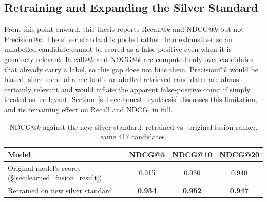 \documentclass[a4paper,oneside,bibliography=totoc]{scrbook}
\begin{document}
\subsection{Retraining and Expanding the Silver Standard}
\label{subsec:refit_fusion_ranker_result}

From this point onward, this thesis reports Recall@$k$ and NDCG@$k$ but not Precision@$k$. The silver standard is pooled rather than exhaustive, so an unlabelled candidate cannot be scored as a false positive even when it is genuinely relevant. Recall@$k$ and NDCG@$k$ are computed only over candidates that already carry a label, so this gap does not bias them. Precision@$k$ would be biased, since some of a method's unlabelled retrieved candidates are almost certainly relevant and would inflate the apparent false-positive count if simply treated as irrelevant. Section~\ref{subsec:honest_synthesis} discusses this limitation, and its remaining effect on Recall and NDCG, in full.

\begin{table}[ht]
\centering
\caption{NDCG@$k$ against the new silver standard: retrained vs.\ original fusion ranker, same 417 candidates.}
\label{tab:pooled_ndcg}
\begin{tabular}{lccc}
\toprule
\textbf{Model} & \textbf{NDCG@5} & \textbf{NDCG@10} & \textbf{NDCG@20} \\
\midrule
Original model's scores (\S\ref{sec:learned_fusion_result}) & 0.915 & 0.930 & 0.940 \\
Retrained on new silver standard        & \textbf{0.934} & \textbf{0.952} & \textbf{0.947} \\
\bottomrule
\end{tabular}
\end{table}
\end{document}
